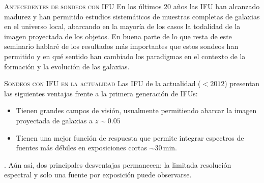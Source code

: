 \documentclass[xcolor=dvipsnames,4pt,hyperref={colorlinks,citecolor=black,linkcolor=black,urlcolor=black}]{beamer}
\begin{document}
\begin{frame}[allowframebreaks]{\textsc{Antecedentes de sondeos con IFU}}
En los últimos 20 años las IFU han alcanzado madurez y han permitido estudios sistemáticos de
muestras completas de galaxias en el universo local, abarcando en la mayoría de los casos la
todalidad de la imagen proyectada de los objetos. En buena parte de lo que resta de este seminario
hablaré de los resultados más importantes que estos sondeos han permitido y en qué sentido han
cambiado los paradigmas en el contexto de la formación y la evolución de las galaxias.
%
%
\end{frame}

\begin{frame}[allowframebreaks]{\textsc{Sondeos con IFU en la actualidad}}
%
Las IFU de la actualidad ($<2012$) presentan las siguientes ventajas frente a la primera generación
de IFUs:
%
\begin{itemize}
%
\item Tienen grandes campos de visión, usualmente permitiendo abarcar la imagen
proyectada de galaxias a $z\sim0.05$
%
\item Tienen una mejor función de respuesta que permite integrar espectros de fuentes más débiles en
exposiciones cortas $\sim30\,$min.
%
\end{itemize}.
%
Aún así, dos principales desventajas permanecen: la limitada resolución espectral y solo una fuente
por exposición puede observarse.
%
\end{frame}
\end{document}
